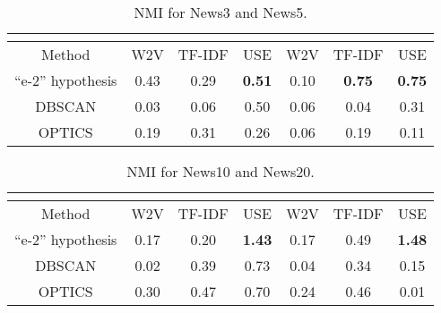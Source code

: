 \begin{table}[ht]%
	\centering
	\caption{NMI for News3 and News5.}%
	\label{tab:nmi35}%
		\begin{tabular}{ c  c  c  c  c  c  c }%
			\toprule
			& \multicolumn{3}{c}{\makecell{News3}} & \multicolumn{3}{c}{\makecell{News5}}\\
			\hline
			Method & W2V & TF-IDF & USE & W2V & TF-IDF & USE \\
			\hline
			“e-2” hypothesis & 0.43 & 0.29 & \textbf{0.51} & 0.10 & \textbf{0.75} & \textbf{0.75} \\
			DBSCAN & 0.03 & 0.06 & 0.50 & 0.06 & 0.04 & 0.31 \\
			OPTICS & 0.19 & 0.31 & 0.26 & 0.06 & 0.19 & 0.11 \\
			\bottomrule
		\end{tabular}%
\end{table}

\begin{table}[ht]%
	\centering
	\caption{NMI for News10 and News20.}%
	\label{tab:nmi1020}%
		\begin{tabular}{ c  c  c  c  c  c  c }%
			\toprule
			& \multicolumn{3}{c}{\makecell{News3}} & \multicolumn{3}{c}{\makecell{News5}}\\
			\hline
			Method & W2V & TF-IDF & USE & W2V & TF-IDF & USE \\
			\hline
			“e-2” hypothesis & 0.17 & 0.20 & \textbf{1.43} & 0.17 & 0.49 & \textbf{1.48} \\
			DBSCAN & 0.02 & 0.39 & 0.73 & 0.04 & 0.34 & 0.15 \\
			OPTICS & 0.30 & 0.47 & 0.70 & 0.24 & 0.46 & 0.01 \\
			\bottomrule
		\end{tabular}%
\end{table}

